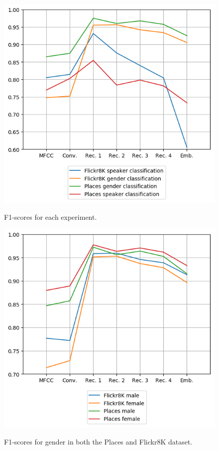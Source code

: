 \documentclass[a4paper, oneside]{book}
\begin{document}
\begin{figure}[h!]
	\centering
	\includegraphics[scale=0.8]{images/gender-speaker-classification.png}\\
	\caption{\label{table:gender-speaker-classification} F1-scores for each experiment.  }
\end{figure}

\begin{figure}[h!]
	\centering
	\includegraphics[scale=0.8]{images/gender-bias.png}\\
	\caption{\label{table:gender-bias} F1-scores for gender in both the Places and Flickr8K dataset.  }
\end{figure}
\end{document}
